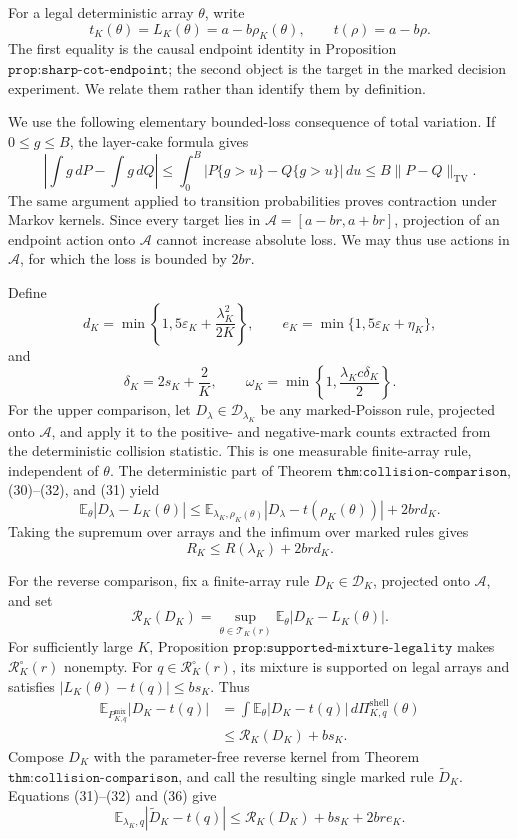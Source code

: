 For a legal deterministic array \(\theta\), write
\[
 t_K(\theta)=L_K(\theta)=a-b\rho_K(\theta),
 \qquad
 t(\rho)=a-b\rho.
 \tag{30}
\]
The first equality is the causal endpoint identity in Proposition
\(\texttt{prop:sharp-cot-endpoint}\); the second object is the target in
the marked decision experiment.  We relate them rather than identify
them by definition.

We use the following elementary bounded-loss consequence of total
variation.  If \(0\le g\le B\), the layer-cake formula gives
\[
 \left|\int g\,dP-\int g\,dQ\right|
 \le\int_0^B|P\{g>u\}-Q\{g>u\}|\,du
 \le B\|P-Q\|_{\mathrm{TV}}.
 \tag{31}
\]
The same argument applied to transition probabilities proves contraction
under Markov kernels.  Since every target lies in
\(\mathcal A=[a-br,a+br]\), projection of an endpoint action onto
\(\mathcal A\) cannot increase absolute loss.  We may thus use actions
in \(\mathcal A\), for which the loss is bounded by \(2br\).

Define
\[
 d_K=\min\left\{1,5\varepsilon_K+\frac{\lambda_K^2}{2K}\right\},
 \qquad
 e_K=\min\{1,5\varepsilon_K+\eta_K\},
 \tag{32}
\]
and
\[
 \delta_K=2s_K+\frac2K,
 \qquad
 \omega_K=\min\left\{1,\frac{\lambda_Kc\delta_K}{2}\right\}.
 \tag{33}
\]
For the upper comparison, let
\(D_\lambda\in\mathscr D_{\lambda_K}\) be any marked-Poisson rule,
projected onto \(\mathcal A\), and apply it to the positive- and
negative-mark counts extracted from the deterministic collision
statistic.  This is one measurable finite-array rule, independent of
\(\theta\).  The deterministic part of Theorem
\(\texttt{thm:collision-comparison}\), (30)--(32), and (31) yield
\[
 \mathbb E_\theta|D_\lambda-L_K(\theta)|
 \le
 \mathbb E_{\lambda_K,\rho_K(\theta)}
 |D_\lambda-t(\rho_K(\theta))|+2brd_K.
 \tag{34}
\]
Taking the supremum over arrays and the infimum over marked rules gives
\[
 R_K\le R(\lambda_K)+2brd_K.
 \tag{35}
\]

For the reverse comparison, fix a finite-array rule
\(D_K\in\mathscr D_K\), projected onto \(\mathcal A\), and set
\[
 \mathcal R_K(D_K)=
 \sup_{\theta\in\mathcal T_K(r)}
 \mathbb E_\theta|D_K-L_K(\theta)|.
\]
For sufficiently large \(K\), Proposition
\(\texttt{prop:supported-mixture-legality}\) makes
\(\mathcal R_K^\circ(r)\) nonempty.  For
\(q\in\mathcal R_K^\circ(r)\), its mixture is supported on legal arrays
and satisfies \(|L_K(\theta)-t(q)|\le bs_K\).  Thus
\[
\begin{aligned}
 \mathbb E_{P^{\mathrm{mix}}_{K,q}}|D_K-t(q)|
 &=\int\mathbb E_\theta|D_K-t(q)|
      \,d\Pi_{K,q}^{\mathrm{shell}}(\theta)\\
 &\le\mathcal R_K(D_K)+bs_K.
\end{aligned}
\tag{36}
\]
Compose \(D_K\) with the parameter-free reverse kernel from Theorem
\(\texttt{thm:collision-comparison}\), and call the resulting single
marked rule \(\widetilde D_K\).  Equations (31)--(32) and (36) give
\[
 \mathbb E_{\lambda_K,q}|\widetilde D_K-t(q)|
 \le\mathcal R_K(D_K)+bs_K+2bre_K.
 \tag{37}
\]

